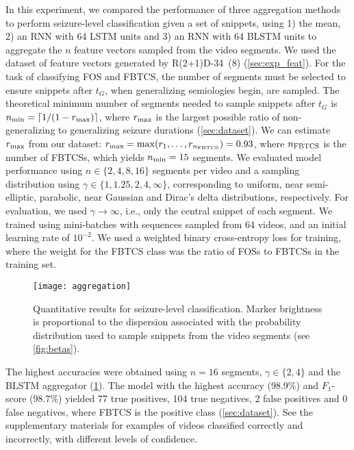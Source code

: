 In this experiment, we compared the performance of three aggregation methods to perform seizure-level classification given a set of snippets, using
1) the mean,
2) an \ac{RNN} with 64 \ac{LSTM} units and
3) an \ac{RNN} with 64 \ac{BLSTM} units
to aggregate the $n$ feature vectors sampled from the video segments.
We used the dataset of feature vectors generated by \mbox{R(2+1)D-34 (8)} (\cref{sec:exp_feat}).
For the task of classifying \ac{FOS} and \ac{FBTCS}, the number of segments must be selected to ensure snippets after $t_G$, when generalizing semiologies begin, are sampled.
The theoretical minimum number of segments needed to sample snippets after $t_G$ is $n_{\text{min}} = \lceil 1 / (1 - r_{\text{max}}) \rceil $, where $r_{\text{max}}$ is the largest possible ratio of non-generalizing to generalizing seizure durations (\cref{sec:dataset}).
We can estimate $r_{\text{max}}$ from our dataset: $r_{\text{max}} = \max ( r_1, \dots, r_{n_{\text{FBTCS}}} ) = 0.93$, where $n_{\text{FBTCS}}$ is the number of \acp{FBTCS}, which yields $n_{\text{min}} = 15$ segments.
We evaluated model performance using $n \in \{2, 4, 8, 16\}$ segments per video and a sampling distribution using $\gamma \in \{ 1, 1.25, 2, 4, \infty \}$, corresponding to uniform, near semi-elliptic, parabolic, near Gaussian and Dirac's delta distributions, respectively.
For evaluation, we used $\gamma \rightarrow \infty$, i.e., only the central snippet of each segment.
We trained using mini-batches with sequences sampled from 64 videos, and an initial learning rate of $10 ^ {-2}$.
We used a weighted binary cross-entropy loss for training, where the weight for the \ac{FBTCS} class was the ratio of \acp{FOS} to \acp{FBTCS} in the training set.


\begin{figure}
  \centering
  \texttt{[image: aggregation]}
  \caption[Quantitative results for seizure-level classification]{
    Quantitative results for seizure-level classification.
    Marker brightness is proportional to the dispersion associated with the probability distribution used to sample snippets from the video segments (see \cref{fig:betas}).
  }
  \label{fig:aggregation}
\end{figure}

The highest accuracies were obtained using $n = 16$ segments, $\gamma \in \{ 2, 4 \}$ and the \ac{BLSTM} aggregator (\cref{fig:aggregation}).
The model with the highest accuracy (98.9\%) and $F_1$-score (98.7\%) yielded 77 true positives, 104 true negatives, 2 false positives and 0 false negatives, where \ac{FBTCS} is the positive class (\cref{sec:dataset}).
See the supplementary materials%
for examples of videos classified correctly and incorrectly, with different levels of confidence.
